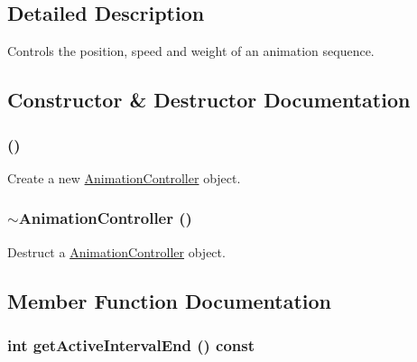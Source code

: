 \subsection{Detailed Description}
Controls the position, speed and weight of an animation sequence. 

\subsection{Constructor \& Destructor Documentation}
\hypertarget{classm3g_1_1AnimationController_f2e8cb2c6c916983d0f87140c7b0c98e}{
\subsubsection[{AnimationController}]{ ()}}
\label{classm3g_1_1AnimationController_f2e8cb2c6c916983d0f87140c7b0c98e}


Create a new \hyperlink{classm3g_1_1AnimationController}{AnimationController} object. \hypertarget{classm3g_1_1AnimationController_346849d0f82278f30dda9f35f80e9dbe}{
\subsubsection[{$\sim$AnimationController}]{\setlength{\rightskip}{0pt plus 5cm}$\sim${\bf AnimationController} ()}}
\label{classm3g_1_1AnimationController_346849d0f82278f30dda9f35f80e9dbe}


Destruct a \hyperlink{classm3g_1_1AnimationController}{AnimationController} object. 

\subsection{Member Function Documentation}
\hypertarget{classm3g_1_1AnimationController_7caa95c7ed5a03844abe328feaae4911}{
\subsubsection[{getActiveIntervalEnd}]{\setlength{\rightskip}{0pt plus 5cm}int getActiveIntervalEnd () const}}
\label{classm3g_1_1AnimationController_7caa95c7ed5a03844abe328feaae4911}


